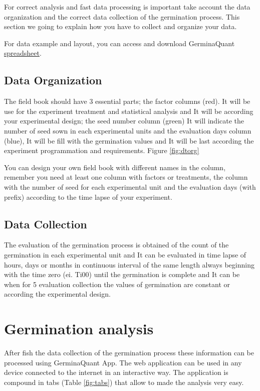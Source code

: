 \documentclass[]{book}
\begin{document}
For correct analysis and fast data processing is important take account
the data organization and the correct data collection of the germination
process. This section we going to explain how you have to collect and
organize your data.

For data example and layout, you can access and download GerminaQuant
\href{https://docs.google.com/spreadsheets/d/1QziIXGOwb8cl3GaARJq6Ez6aU7vND_UHKJnFcAKx0VI/edit\#gid=667855537}{spreadsheet}.

\section{Data Organization}\label{data-organization}

The field book should have 3 essential parts; the factor columns (red).
It will be use for the experiment treatment and statistical analysis and
It will be according your experimental design; the seed number column
(green) It will indicate the number of seed sown in each experimental
units and the evaluation days column (blue), It will be fill with the
germination values and It will be last according the experiment
programmation and requirements. Figure \ref{fig:dtorg}

You can design your own field book with different names in the column,
remember you need at least one column with factors or treatments, the
column with the number of seed for each experimental unit and the
evaluation days (with prefix) according to the time lapse of your
experiment.

\section{Data Collection}\label{data-collection}

The evaluation of the germination process is obtained of the count of
the germination in each experimental unit and It can be evaluated in
time lapse of hours, days or months in continuous interval of the same
length always beginning with the time zero (ei. Ti00) until the
germination is complete and It can be when for 5 evaluation collection
the values of germination are constant or according the experimental
design.

\chapter{Germination analysis}\label{germination-analysis}

After fish the data collection of the germination process these
information can be processed using GerminaQuant App. The web application
can be used in any device connected to the internet in an interactive
way. The application is compound in tabs (Table \ref{fig:tabs}) that
allow to made the analysis very easy.
\end{document}
